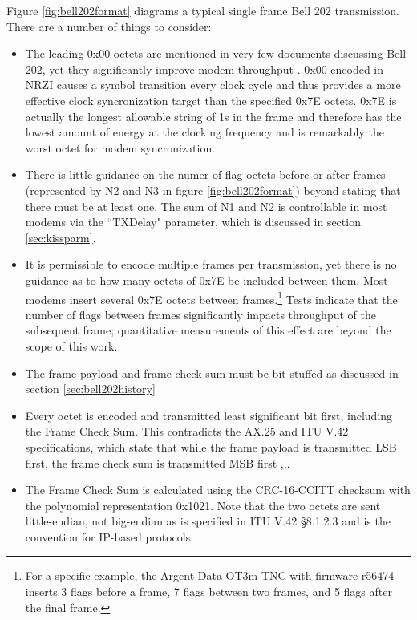 Figure \ref{fig:bell202format} diagrams a typical single frame
Bell 202 transmission. There are a number of things to
consider:
\begin{itemize}
	\item The leading 0x00 octets are mentioned in very few documents
		discussing Bell 202, yet they significantly improve modem
		throughput \cite{millerinterview}. 
		0x00 encoded in NRZI causes a symbol transition
		every clock cycle and thus provides a more effective clock 
		syncronization target than the specified 0x7E octets. 0x7E is actually 
		the longest allowable string of 1s in the frame and 
		therefore has the lowest amount of energy at the clocking frequency
		and is remarkably the worst octet for modem syncronization.
	\item There is little guidance on the numer of flag octets before
		or after frames (represented by N2 and N3 in 
		figure \ref{fig:bell202format})
		beyond stating that there must be at least one. The sum of
		N1 and N2 is controllable in most modems via the ``TXDelay" parameter,
		which is discussed in section \ref{sec:kissparm}.
	\item It is permissible to encode multiple 
		frames per transmission, yet there is no guidance as to how
		many octets of 0x7E be included between them.
		Most modems insert several 0x7E octets between 
		frames.\footnote{For a specific example, the Argent Data OT3m TNC 
			with firmware r56474 inserts 3 flags before
		a frame, 7 flags between two frames, and 5 flags after the final frame.}
		Tests indicate that the number of flags between frames 
		significantly impacts throughput of the subsequent frame;
		quantitative measurements of this effect are beyond the 
		scope of this work.
	\item The frame payload and frame check sum must be bit stuffed as
		discussed in section \ref{sec:bell202history}
	\item Every octet is encoded and transmitted least significant bit first,
		including the Frame Check Sum.
		This contradicts the AX.25 and ITU V.42 specifications, 
		which state
		that while the frame payload is transmitted LSB first, the frame
		check sum is transmitted MSB first 
		\cite[\S3.8]{ax25spec},\cite{n1vgphy},\cite[\S8.1.2.2-3]{ituv42}.
	\item The Frame Check Sum is calculated using the CRC-16-CCITT checksum
		with the polynomial representation 0x1021. 
		Note that the two octets are sent little-endian, not
		big-endian as is specified in ITU V.42 \S8.1.2.3 and is the
		convention for IP-based protocols.

\end{itemize}

